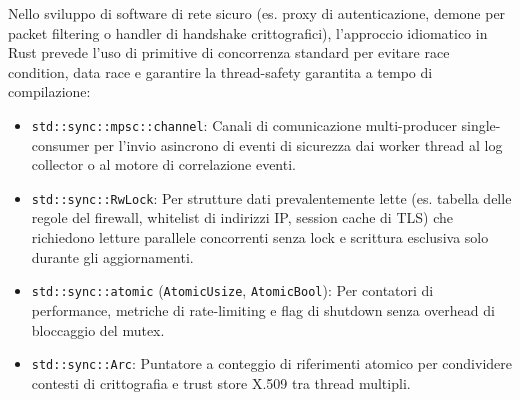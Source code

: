 \documentclass[11pt,a4paper]{article}
\begin{document}
\begin{altbox}
Nello sviluppo di software di rete sicuro (es. proxy di autenticazione, demone per packet filtering o handler di handshake crittografici), l'approccio idiomatico in Rust prevede l'uso di primitive di concorrenza standard per evitare race condition, data race e garantire la thread-safety garantita a tempo di compilazione:
\begin{itemize}
    \item \texttt{std::sync::mpsc::channel}: Canali di comunicazione multi-producer single-consumer per l'invio asincrono di eventi di sicurezza dai worker thread al log collector o al motore di correlazione eventi.
    \item \texttt{std::sync::RwLock}: Per strutture dati prevalentemente lette (es. tabella delle regole del firewall, whitelist di indirizzi IP, session cache di TLS) che richiedono letture parallele concorrenti senza lock e scrittura esclusiva solo durante gli aggiornamenti.
    \item \texttt{std::sync::atomic} (\texttt{AtomicUsize}, \texttt{AtomicBool}): Per contatori di performance, metriche di rate-limiting e flag di shutdown senza overhead di bloccaggio del mutex.
    \item \texttt{std::sync::Arc}: Puntatore a conteggio di riferimenti atomico per condividere contesti di crittografia e trust store X.509 tra thread multipli.
\end{itemize}
\end{altbox}
\end{document}

